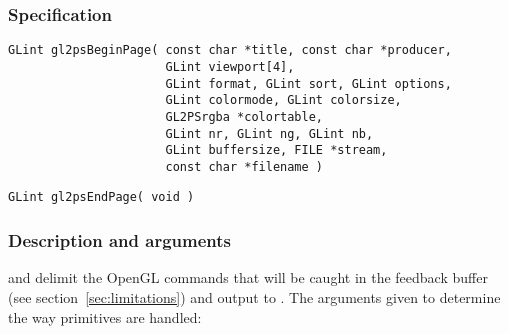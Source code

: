 \subsubsection{Specification}

\begin{verbatim}
GLint gl2psBeginPage( const char *title, const char *producer,
                      GLint viewport[4],
                      GLint format, GLint sort, GLint options,
                      GLint colormode, GLint colorsize,
                      GL2PSrgba *colortable,
                      GLint nr, GLint ng, GLint nb,
                      GLint buffersize, FILE *stream,
                      const char *filename )
\end{verbatim}

\begin{verbatim}
GLint gl2psEndPage( void )
\end{verbatim}

\subsubsection{Description and arguments}

 and  delimit the OpenGL commands that
will be caught in the feedback buffer (see section~\ref{sec:limitations})
and output to . The arguments given to 
determine the way primitives are handled:

